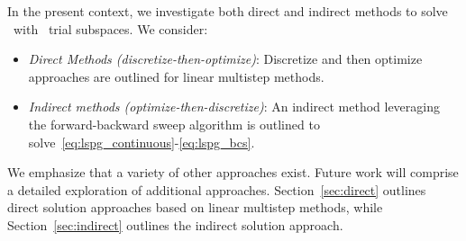 In the present context, we investigate both direct and indirect methods to solve \methodAcronym\ with \spatialAcronym\ trial
subspaces. We consider: 
\begin{itemize} \item \textit{Direct Methods (discretize-then-optimize)}: Discretize and then optimize approaches are outlined for linear multistep methods. 
\item \textit{Indirect methods (optimize-then-discretize)}: An indirect method leveraging the forward-backward sweep algorithm is outlined 
to solve~\eqref{eq:lspg_continuous}-\eqref{eq:lspg_bcs}. 
\end{itemize} 
We emphasize that a variety of other approaches exist. Future work will comprise a detailed exploration
of additional approaches.
Section~\ref{sec:direct}  outlines direct solution approaches based on linear
multistep methods, while Section~\ref{sec:indirect} outlines the indirect
solution approach. 





